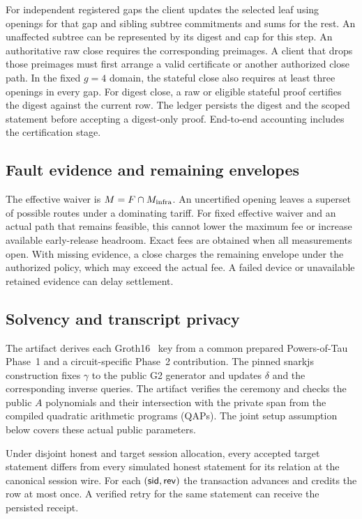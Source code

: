 For independent registered gaps the client updates the selected leaf using openings for that gap and sibling subtree commitments and sums for the rest. An unaffected subtree can be represented by its digest and cap for this step. An authoritative raw close requires the corresponding preimages. A client that drops those preimages must first arrange a valid certificate or another authorized close path. In the fixed $g=4$ domain, the stateful close also requires at least three openings in every gap. For digest close, a raw or eligible stateful proof certifies the digest against the current row. The ledger persists the digest and the scoped statement before accepting a digest-only proof. End-to-end accounting includes the certification stage.

\subsection{Fault evidence and remaining envelopes}
The effective waiver is $M=F\cap M_{\mathrm{infra}}$. An uncertified opening leaves a superset of possible routes under a dominating tariff. For fixed effective waiver and an actual path that remains feasible, this cannot lower the maximum fee or increase available early-release headroom. Exact fees are obtained when all measurements open. With missing evidence, a close charges the remaining envelope under the authorized policy, which may exceed the actual fee. A failed device or unavailable retained evidence can delay settlement.

\subsection{Solvency and transcript privacy}
The artifact derives each Groth16~\cite{groth2016} key from a common prepared Powers-of-Tau Phase~1 and a circuit-specific Phase~2 contribution. The pinned snarkjs construction fixes $\gamma$ to the public G2 generator and updates $\delta$ and the corresponding inverse queries. The artifact verifies the ceremony and checks the public $A$ polynomials and their intersection with the private span from the compiled quadratic arithmetic programs (QAPs). The joint setup assumption below covers these actual public parameters.

\begin{lemma}
\label{lem:freshness}
Under disjoint honest and target session allocation, every accepted target statement differs from every simulated honest statement for its relation at the canonical session wire. For each $(\mathsf{sid},\mathsf{rev})$ the transaction advances and credits the row at most once. A verified retry for the same statement can receive the persisted receipt.
\end{lemma}

